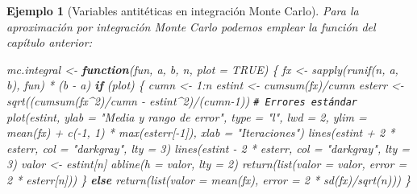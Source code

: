 \documentclass[
]{book}
\newenvironment{Shaded}{\begin{snugshade}}{\end{snugshade}}
\newcommand{\AttributeTok}[1]{\textcolor[rgb]{0.77,0.63,0.00}{#1}}
\newcommand{\CommentTok}[1]{\textcolor[rgb]{0.56,0.35,0.01}{\textit{#1}}}
\newcommand{\ConstantTok}[1]{\textcolor[rgb]{0.00,0.00,0.00}{#1}}
\newcommand{\ControlFlowTok}[1]{\textcolor[rgb]{0.13,0.29,0.53}{\textbf{#1}}}
\newcommand{\DecValTok}[1]{\textcolor[rgb]{0.00,0.00,0.81}{#1}}
\newcommand{\FunctionTok}[1]{\textcolor[rgb]{0.00,0.00,0.00}{#1}}
\newcommand{\NormalTok}[1]{#1}
\newcommand{\OtherTok}[1]{\textcolor[rgb]{0.56,0.35,0.01}{#1}}
\newcommand{\SpecialCharTok}[1]{\textcolor[rgb]{0.00,0.00,0.00}{#1}}
\newcommand{\StringTok}[1]{\textcolor[rgb]{0.31,0.60,0.02}{#1}}
\theoremstyle{break}
\newtheorem{example}{Ejemplo}[chapter]
\theoremstyle{nonumberplain}
\renewcommand{\CommentTok}[1]{\textcolor[rgb]{0.41,0.41,0.41}{\texttt{#1}}}
\begin{document}
\begin{example}[Variables antitéticas en integración Monte Carlo]
Para la aproximación por integración Monte Carlo podemos emplear la función del capítulo anterior:

\begin{Shaded}
\begin{Highlighting}[]
\NormalTok{mc.integral }\OtherTok{\textless{}{-}} \ControlFlowTok{function}\NormalTok{(fun, a, b, n, }\AttributeTok{plot =} \ConstantTok{TRUE}\NormalTok{) \{}
\NormalTok{  fx }\OtherTok{\textless{}{-}} \FunctionTok{sapply}\NormalTok{(}\FunctionTok{runif}\NormalTok{(n, a, b), fun) }\SpecialCharTok{*}\NormalTok{ (b }\SpecialCharTok{{-}}\NormalTok{ a)}
  \ControlFlowTok{if}\NormalTok{ (plot) \{}
\NormalTok{    cumn }\OtherTok{\textless{}{-}} \DecValTok{1}\SpecialCharTok{:}\NormalTok{n}
\NormalTok{    estint }\OtherTok{\textless{}{-}} \FunctionTok{cumsum}\NormalTok{(fx)}\SpecialCharTok{/}\NormalTok{cumn}
\NormalTok{    esterr }\OtherTok{\textless{}{-}} \FunctionTok{sqrt}\NormalTok{((}\FunctionTok{cumsum}\NormalTok{(fx}\SpecialCharTok{\^{}}\DecValTok{2}\NormalTok{)}\SpecialCharTok{/}\NormalTok{cumn }\SpecialCharTok{{-}}\NormalTok{ estint}\SpecialCharTok{\^{}}\DecValTok{2}\NormalTok{)}\SpecialCharTok{/}\NormalTok{(cumn}\DecValTok{{-}1}\NormalTok{)) }\CommentTok{\# Errores estándar}
    \FunctionTok{plot}\NormalTok{(estint, }\AttributeTok{ylab =} \StringTok{"Media y rango de error"}\NormalTok{, }\AttributeTok{type =} \StringTok{"l"}\NormalTok{, }\AttributeTok{lwd =} \DecValTok{2}\NormalTok{, }\AttributeTok{ylim =} \FunctionTok{mean}\NormalTok{(fx) }\SpecialCharTok{+} 
           \FunctionTok{c}\NormalTok{(}\SpecialCharTok{{-}}\DecValTok{1}\NormalTok{, }\DecValTok{1}\NormalTok{) }\SpecialCharTok{*} \FunctionTok{max}\NormalTok{(esterr[}\SpecialCharTok{{-}}\DecValTok{1}\NormalTok{]), }\AttributeTok{xlab =} \StringTok{"Iteraciones"}\NormalTok{)}
    \FunctionTok{lines}\NormalTok{(estint }\SpecialCharTok{+} \DecValTok{2} \SpecialCharTok{*}\NormalTok{ esterr, }\AttributeTok{col =} \StringTok{"darkgray"}\NormalTok{, }\AttributeTok{lty =} \DecValTok{3}\NormalTok{)}
    \FunctionTok{lines}\NormalTok{(estint }\SpecialCharTok{{-}} \DecValTok{2} \SpecialCharTok{*}\NormalTok{ esterr, }\AttributeTok{col =} \StringTok{"darkgray"}\NormalTok{, }\AttributeTok{lty =} \DecValTok{3}\NormalTok{)}
\NormalTok{    valor }\OtherTok{\textless{}{-}}\NormalTok{ estint[n]}
    \FunctionTok{abline}\NormalTok{(}\AttributeTok{h =}\NormalTok{ valor, }\AttributeTok{lty =} \DecValTok{2}\NormalTok{)}
    \FunctionTok{return}\NormalTok{(}\FunctionTok{list}\NormalTok{(}\AttributeTok{valor =}\NormalTok{ valor, }\AttributeTok{error =} \DecValTok{2} \SpecialCharTok{*}\NormalTok{ esterr[n]))}
\NormalTok{  \} }\ControlFlowTok{else} \FunctionTok{return}\NormalTok{(}\FunctionTok{list}\NormalTok{(}\AttributeTok{valor =} \FunctionTok{mean}\NormalTok{(fx), }\AttributeTok{error =} \DecValTok{2} \SpecialCharTok{*} \FunctionTok{sd}\NormalTok{(fx)}\SpecialCharTok{/}\FunctionTok{sqrt}\NormalTok{(n)))}
\NormalTok{\} }


\end{Highlighting}
\end{Shaded}
\end{example}
\end{document}
